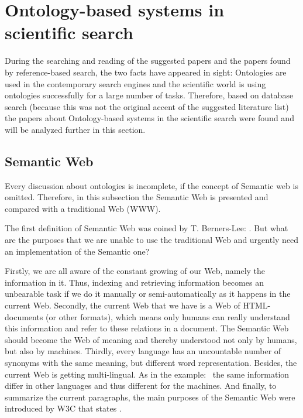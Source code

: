 \section{Ontology-based systems in scientific search}
During the searching and reading of the suggested papers and the papers found by reference-based search, the two facts have appeared in sight: Ontologies are used in the contemporary search engines and the scientific world is using ontologies successfully for a large number of tasks. Therefore, based on database search (because this was not the original accent of the suggested literature list) the papers about Ontology-based systems in the scientific search were found and will be analyzed further in this section.
		\subsection{Semantic Web}
		\label{sec:SemWeb}
		Every discussion about ontologies is incomplete, if the concept of Semantic web is omitted. Therefore, in this subsection the Semantic Web is presented and compared with a traditional Web (WWW).
		
		The first definition of Semantic Web was coined by T. Berners-Lee: \frqq\cite{Ber01}. But what are the purposes that we are unable to use the traditional Web and urgently need an implementation of the Semantic one? 
		
		Firstly, we are all aware of the constant growing of our Web, namely the information in it. Thus, indexing and retrieving information becomes an unbearable task if we do it manually or semi-automatically as it happens in the current Web. Secondly, the current Web that we have is a Web of HTML-documents (or other formats), which means only humans can really understand this information and refer to these relations in a document. The Semantic Web should become the Web of meaning and thereby understood not only by humans, but also by machines. Thirdly, every language has an uncountable number of synonyms with the same meaning, but different word representation. Besides, the current Web is getting multi-lingual. As in the example: \frqq\cite[p. 40]{Raj14} \ the same information differ in other languages and thus different for the machines. And finally, to summarize the current paragraphs, the main purposes of the Semantic Web were introduced by W3C that states \frqq\cite{w3c01}.
		
